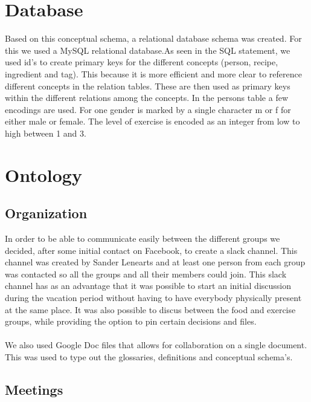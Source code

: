 \section{Database}
Based on this conceptual schema, a relational database schema was created. For this we used a MySQL relational database.As seen in the SQL statement, we used id's to create primary keys for the different concepts (person, recipe, ingredient and tag). This because it is more efficient and more clear to reference different concepts in the relation tables. These are then used as primary keys within the different relations among the concepts. In the persons table a few encodings are used. For one gender is marked by a single character m or f for either male or female. The level of exercise is encoded as an integer from low to high between 1 and 3.\\

\section{Ontology}

\subsection{Organization}

In order to be able to communicate easily between the different groups we decided, after some initial contact on Facebook, to create a slack channel. This channel was created by Sander Lenearts and at least one person from each group was contacted so all the groups and all their members could join. This slack channel has as an advantage that it was possible to start an initial discussion during the vacation period without having to have everybody physically present at the same place. It was also possible to discus between the food and exercise groups, while providing the option to pin certain decisions and files.\\ \\
We also used Google Doc files that allows for collaboration on a single document. This was used to type out the glossaries, definitions and conceptual schema's.

\subsection{Meetings}

